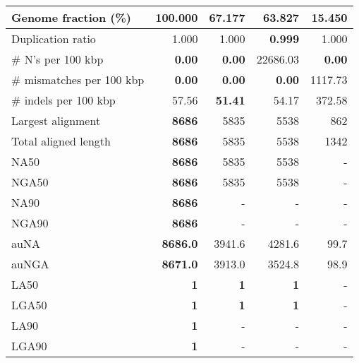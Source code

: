 \documentclass[12pt,a4paper]{article}
\begin{document}
\begin{table}[ht]
\begin{center}
\begin{tabular}{|l*{4}{|r}|}
Genome fraction (\%) & {\bf 100.000} & 67.177 & 63.827 & 15.450 \\ \hline
Duplication ratio & 1.000 & 1.000 & {\bf 0.999} & 1.000 \\ \hline
\# N's per 100 kbp & {\bf 0.00} & {\bf 0.00} & 22686.03 & {\bf 0.00} \\ \hline
\# mismatches per 100 kbp & {\bf 0.00} & {\bf 0.00} & {\bf 0.00} & 1117.73 \\ \hline
\# indels per 100 kbp & 57.56 & {\bf 51.41} & 54.17 & 372.58 \\ \hline
Largest alignment & {\bf 8686} & 5835 & 5538 & 862 \\ \hline
Total aligned length & {\bf 8686} & 5835 & 5538 & 1342 \\ \hline
NA50 & {\bf 8686} & 5835 & 5538 & - \\ \hline
NGA50 & {\bf 8686} & 5835 & 5538 & - \\ \hline
NA90 & {\bf 8686} & - & - & - \\ \hline
NGA90 & {\bf 8686} & - & - & - \\ \hline
auNA & {\bf 8686.0} & 3941.6 & 4281.6 & 99.7 \\ \hline
auNGA & {\bf 8671.0} & 3913.0 & 3524.8 & 98.9 \\ \hline
LA50 & {\bf 1} & {\bf 1} & {\bf 1} & - \\ \hline
LGA50 & {\bf 1} & {\bf 1} & {\bf 1} & - \\ \hline
LA90 & {\bf 1} & - & - & - \\ \hline
LGA90 & {\bf 1} & - & - & - \\ \hline
\end{tabular}
\end{center}
\end{table}
\end{document}
